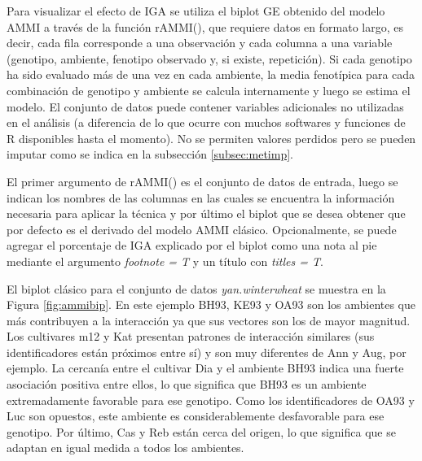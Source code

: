 Para visualizar el efecto de IGA se utiliza el biplot GE obtenido del modelo AMMI a través de la función \textcolor{fandango}{rAMMI()}, que requiere datos en formato largo, es decir, cada fila corresponde a una observación y cada columna a una variable (genotipo, ambiente, fenotipo observado y, si existe, repetición). Si cada genotipo ha sido evaluado más de una vez en cada ambiente, la media fenotípica para cada combinación de genotipo y ambiente se calcula internamente y luego se estima el modelo. El conjunto de datos puede contener variables adicionales no utilizadas en el análisis (a diferencia de lo que ocurre con muchos softwares y funciones de R disponibles hasta el momento). No se permiten valores perdidos pero se pueden imputar como se indica en la subsección \ref{subsec:metimp}. 

El primer argumento de \textcolor{fandango}{rAMMI()} es el conjunto de datos de entrada, luego se indican los nombres de las columnas en las cuales se encuentra la información necesaria para aplicar la técnica y por último el biplot que se desea obtener que por defecto es el derivado del modelo AMMI clásico. Opcionalmente, se puede agregar el porcentaje de IGA explicado por el biplot como una nota al pie mediante el argumento \emph{footnote = T} y un título con \emph{titles = T}. 

El biplot clásico para el conjunto de datos \emph{yan.winterwheat} se muestra en la Figura
\ref{fig:ammibip}. En este ejemplo BH93, KE93 y OA93 son los ambientes que más contribuyen a la interacción ya que sus vectores son los de mayor magnitud. Los cultivares m12 y Kat presentan patrones de interacción similares (sus identificadores están próximos entre sí) y son muy diferentes de Ann y Aug, por ejemplo. La cercanía entre el cultivar Dia y el ambiente BH93 indica una fuerte asociación positiva entre ellos, lo que significa que BH93 es un ambiente extremadamente favorable para ese genotipo. Como los identificadores de OA93 y Luc son opuestos, este ambiente es considerablemente desfavorable para ese genotipo. Por último, Cas y Reb están cerca del origen, lo que significa que se adaptan en igual medida a todos los ambientes.

